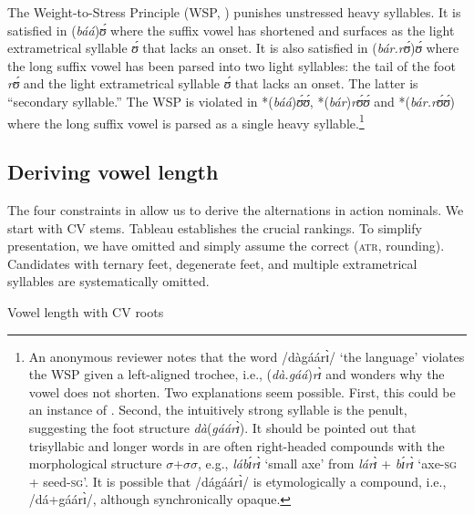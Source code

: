 \documentclass[output=paper,newtxmath,modfonts,nonflat,draftmode]{langsci/langscibook}
\begin{document}
The Weight-to-Stress Principle (WSP, \citealt{Prince1990}) punishes unstressed heavy syllables. It is satisfied in (\textit{báá})\textit{ʊ́} where the suffix vowel has shortened and surfaces as the light extrametrical syllable \textit{ʊ́} that lacks an onset. It is also satisfied in (\textit{bár.rʊ́})\textit{ʊ́} where the long suffix vowel has been parsed into two light syllables: the tail of the foot \textit{rʊ́} and the light extrametrical syllable \textit{ʊ́} that lacks an onset. The latter is  ``{secondary syllable}.'' The WSP is violated in *(\textit{báá})\textit{ʊ́ʊ́}, *(\textit{bár})\textit{rʊ́ʊ́} and *(\textit{bár.rʊ́ʊ́}) where the long suffix vowel is parsed as a single heavy syllable.\footnote{An anonymous reviewer notes that the word /dàgáárɪ̀/ ‘the  language’ violates the WSP given a left-aligned trochee, i.e., (\textit{d\`a.g\'a\'a})\textit{r\`ɪ} and wonders why the vowel does not shorten. Two explanations seem possible. First, this could be an instance of  \citep{Kiparsky1993}. Second, the intuitively strong syllable is the penult, suggesting the foot structure \textit{dà}(\textit{gá}\textit{á}\textit{rɪ̀}). It should be pointed out that trisyllabic and longer words in  are often right-headed compounds with the morphological structure $\sigma $+$\sigma \sigma $, e.g., \textit{lá}\textit{bɪ́}\textit{rɪ̀} ‘small axe’ from \textit{lá}\textit{rɪ̀} + \textit{bɪ́}\textit{rɪ̀} ‘axe-\textsc{sg} + seed-\textsc{sg}’. It is possible that /dágáárɪ̀/ is etymologically a compound, i.e., /dá+gáárɪ̀/, although synchronically opaque.} 

\subsection{Deriving vowel length}

The four constraints in  allow us to derive the  alternations in action nominals. We start with CV stems. Tableau  establishes the crucial rankings. To simplify presentation, we have omitted  and simply assume the correct  (\textsc{atr}, rounding). Candidates with ternary feet, degenerate feet, and multiple extrametrical syllables are systematically omitted.

\ea 
Vowel length with CV roots \label{ex:anttila:3}
\end{document}
